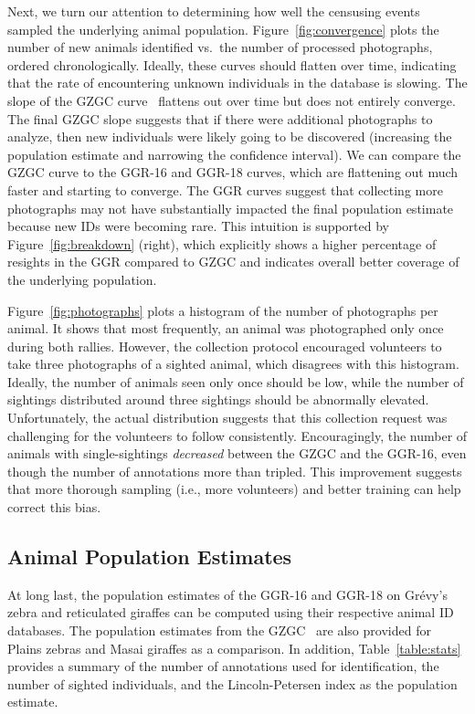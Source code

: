 Next, we turn our attention to determining how well the censusing events sampled the underlying animal population.  Figure~\ref{fig:convergence} plots the number of new animals identified vs.\ the number of processed photographs, ordered chronologically.  Ideally, these curves should flatten over time, indicating that the rate of encountering unknown individuals in the database is slowing.  The slope of the GZGC curve~\cite{parham_photographic_2015} flattens out over time but does not entirely converge.  The final GZGC slope suggests that if there were additional photographs to analyze, then new individuals were likely going to be discovered (increasing the population estimate and narrowing the confidence interval).  We can compare the GZGC curve to the GGR-16 and GGR-18 curves, which are flattening out much faster and starting to converge.  The GGR curves suggest that collecting more photographs may not have substantially impacted the final population estimate because new IDs were becoming rare.  This intuition is supported by Figure~\ref{fig:breakdown} (right), which explicitly shows a higher percentage of resights in the GGR compared to GZGC and indicates overall better coverage of the underlying population.

Figure~\ref{fig:photographs} plots a histogram of the number of photographs per animal. It shows that most frequently, an animal was photographed only once during both rallies. However, the collection protocol encouraged volunteers to take three photographs of a sighted animal, which disagrees with this histogram.  Ideally, the number of animals seen only once should be low, while the number of sightings distributed around three sightings should be abnormally elevated. Unfortunately, the actual distribution suggests that this collection request was challenging for the volunteers to follow consistently.  Encouragingly, the number of animals with single-sightings \textit{decreased} between the GZGC and the GGR-16, even though the number of annotations more than tripled.  This improvement suggests that more thorough sampling (i.e., more volunteers) and better training can help correct this bias.

\subsection{Animal Population Estimates}

At long last, the population estimates of the GGR-16 and GGR-18 on Gr\'evy's zebra and reticulated giraffes can be computed using their respective animal ID databases.  The population estimates from the GZGC~\cite{parham_photographic_2015} are also provided for Plains zebras and Masai giraffes as a comparison. In addition, Table~\ref{table:stats} provides a summary of the number of annotations used for identification, the number of sighted individuals, and the Lincoln-Petersen index as the population estimate.

